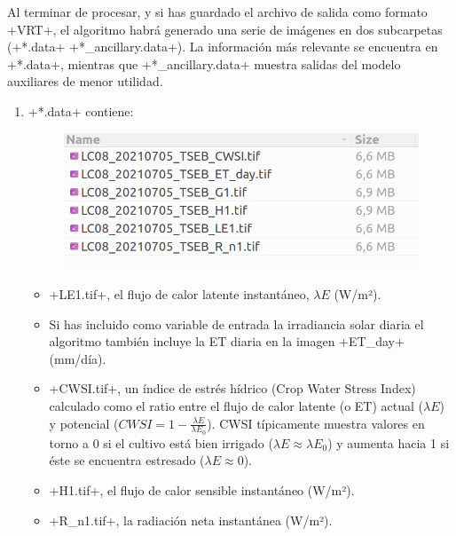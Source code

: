 \documentclass[a4paper,11pt]{article}
\begin{document}
    Al terminar de procesar, y si has guardado el archivo de salida como formato \cverb+VRT+, el algoritmo habrá generado una serie de imágenes en dos subcarpetas (\cverb+*.data+ \cverb+*_ancillary.data+). La información más relevante se encuentra en \cverb+*.data+, mientras que \cverb+*_ancillary.data+ muestra salidas del modelo auxiliares de menor utilidad.
    
    \begin{enumerate}
     \item \cverb+*.data+ contiene:
     
     \begin{figure}[H]\centering
      \includegraphics[width=\textwidth]{pytseb_data_folder}
     \end{figure}

     \begin{itemize}
      \item \cverb+LE1.tif+, el flujo de calor latente instantáneo, $\lambda E$ (W/m²).
      
      \item Si has incluido como variable de entrada la irradiancia solar diaria el algoritmo también incluye la ET diaria en la imagen \cverb+ET_day+ (mm/día).
      
      \item \cverb+CWSI.tif+, un índice de estrés hídrico (Crop Water Stress Index) calculado como el ratio entre el flujo de calor latente (o ET) actual ($\lambda E$) y potencial ($CWSI=1 - \frac{\lambda E}{\lambda E_0}$). CWSI típicamente muestra valores en torno a 0 si el cultivo está bien irrigado ($\lambda E \approx \lambda E_0$) y aumenta hacia 1 si éste se encuentra estresado ($\lambda E \approx 0$). 
      
      \item \cverb+H1.tif+, el flujo de calor sensible instantáneo (W/m²).
      
      \item \cverb+R_n1.tif+, la radiación neta instantánea (W/m²).
      

\end{itemize}
\end{enumerate}
\end{document}
